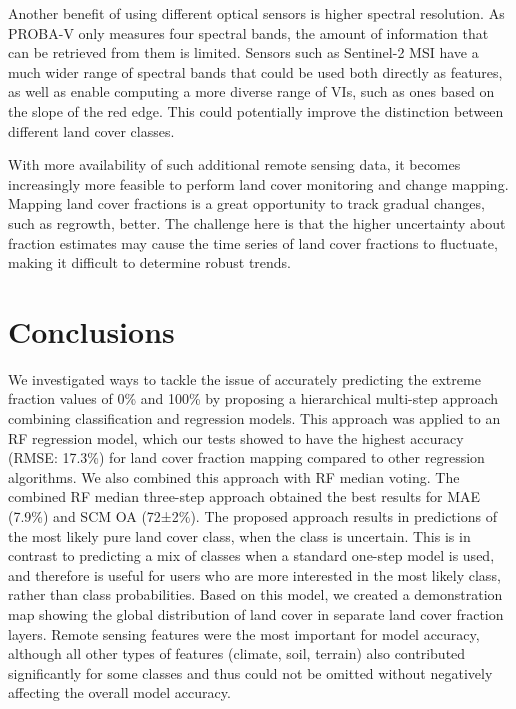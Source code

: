 \documentclass[review,authoryear,3p]{elsarticle}
\begin{document}
Another benefit of using different optical sensors is higher spectral resolution.
As PROBA-V only measures four spectral bands, the amount of information that can be retrieved from them is limited.
Sensors such as Sentinel-2 \gls{MSI} have a much wider range of spectral bands that could be used both directly as features, as well as enable computing a more diverse range of \glspl{VI}, such as ones based on the slope of the red edge.
This could potentially improve the distinction between different land cover classes.

With more availability of such additional remote sensing data, it becomes increasingly more feasible to perform land cover monitoring and change mapping.
Mapping land cover fractions is a great opportunity to track gradual changes, such as regrowth, better.
The challenge here is that the higher uncertainty about fraction estimates may cause the time series of land cover fractions to fluctuate, making it difficult to determine robust trends.

\section{Conclusions}

We investigated ways to tackle the issue of accurately predicting the extreme fraction values of 0\% and 100\% by proposing a hierarchical multi-step approach combining classification and regression models.
This approach was applied to an \gls{RF} regression model, which our tests showed to have the highest accuracy (RMSE: 17.3\%) for land cover fraction mapping compared to other regression algorithms.
We also combined this approach with \gls{RF} median voting.
The combined \gls{RF} median three-step approach obtained the best results for \gls{MAE} (7.9\%) and \gls{SCM} \gls{OA} (72±2\%).
The proposed approach results in predictions of the most likely pure land cover class, when the class is uncertain.
This is in contrast to predicting a mix of classes when a standard one-step model is used, and therefore is useful for users who are more interested in the most likely class, rather than class probabilities.
Based on this model, we created a demonstration map showing the global distribution of land cover in separate land cover fraction layers.
Remote sensing features were the most important for model accuracy, although all other types of features (climate, soil, terrain) also contributed significantly for some classes and thus could not be omitted without negatively affecting the overall model accuracy.
\end{document}
